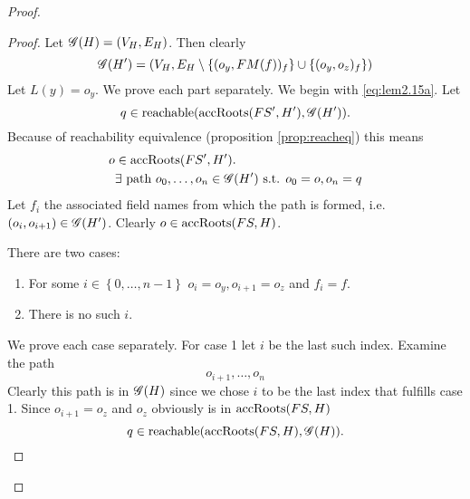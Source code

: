 \begin{proof}
\begin{description}
\begin{description}
\begin{description}
              \begin{proof}
                Let $\mathscr{G}(H) = (V_H, E_H)$. Then clearly
                \begin{equation}
                  \mathscr{G}(H') = \left(V_H, E_H \setminus \{(o_y, FM(f))_f \} \cup
                  \{(o_y, o_z)_f \} \right)
                \end{equation}
                Let $L(y) = o_y$. We prove each part separately. 
                We begin with \eqref{eq:lem2.15a}.  Let
                \begin{equation*}
                  q \in \mbox{$\mathrm{reachable}$}(\mbox{$\mathrm{accRoots}$}(FS', H'), \mathscr{G}(H')).
                \end{equation*}
                Because of reachability equivalence (proposition
                \ref{prop:reacheq}) this means
                \begin{equation}
                  \begin{aligned}
                    o &\in \mbox{$\mathrm{accRoots}$}(FS', H'). \\
                    & \exists \text{ path } o_0, \dots, o_n \in \mathscr{G}(H')
                    \text{ s.t. } o_0 = o, o_n = q
                  \end{aligned}
                \end{equation}
                Let $f_i$ the associated field names from which the path is
                formed, i.e. $(o_i, o_{i+1}) \in \mathscr{G}(H')$.
                Clearly $o \in \mbox{$\mathrm{accRoots}$}(FS, H)$. 

                There are two cases:
                \begin{enumerate}
                  \item For some $i \in \left\{ 0, \dots, n-1 \right\}$ $o_i =
                    o_y, o_{i+1} = o_z$ and $f_i = f$.
                  \item There is no such $i$.
                \end{enumerate}
                We prove each case separately. For case 1 let $i$ be the last
                such index. Examine the path 
                \begin{equation}
                  o_{i+1}, \dots, o_n
                \end{equation}
                Clearly this path is in $\mathscr{G}(H)$ since we chose $i$ to be the
                last index that fulfills case 1.  Since $o_{i+1} = o_z$ and
                $o_z$ obviously is in $\mbox{$\mathrm{accRoots}$}(FS, H)$
                \begin{equation}
                  q \in \mbox{$\mathrm{reachable}$}(\mbox{$\mathrm{accRoots}$}(FS, H), \mathscr{G}(H)).
                \end{equation}


\end{proof}
\end{description}
\end{description}
\end{description}
\end{proof}
